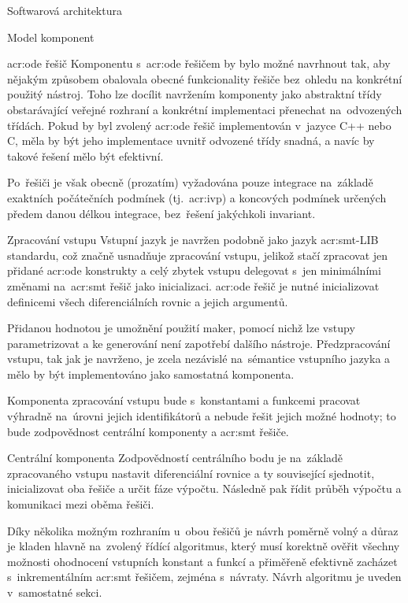 \documentclass[thesis=M,czech]{FITthesis}[2012/06/26]
\newcommand{\acrlabel}[1]{acr:#1}
\newcommand{\acr}[1]{\acrshort{\acrlabel{#1}}}
\begin{document}
\begin{section}{Softwarová architektura}
\begin{subsection}{Model komponent}
\begin{subsubsection}{\acr{ode} řešič}
Komponentu s~\acr{ode} řešičem
by bylo možné navrhnout tak,
aby nějakým způsobem obalovala
obecné funkcionality řešiče
bez~ohledu na konkrétní použitý nástroj.
Toho lze docílit navržením komponenty
jako abstraktní třídy
obstarávající veřejné rozhraní
a konkrétní implementaci přenechat
na~odvozených třídách.
Pokud by byl zvolený \acr{ode} řešič
implementován v~jazyce C++ nebo C,
měla by být jeho implementace
uvnitř odvozené třídy snadná,
a navíc by takové řešení mělo být efektivní.

Po~řešiči je však obecně (prozatím) vyžadována
pouze integrace na~základě
exaktních počátečních podmínek (tj.~\acr{ivp})
a koncových podmínek
určených předem danou délkou integrace,
bez~řešení jakýchkoli invariant.
\end{subsubsection} %


\begin{subsubsection}{Zpracování vstupu}\label{sss:design:arch:comp:parse}
Vstupní jazyk je navržen podobně
jako jazyk \acr{smt}-LIB standardu,
což značně usnadňuje zpracování vstupu,
jelikož stačí zpracovat jen přidané \acr{ode} konstrukty
a celý zbytek vstupu delegovat s~jen minimálními změnami
na~\acr{smt} řešič jako inicializaci.
\acr{ode} řešič je nutné inicializovat
definicemi všech diferenciálních rovnic
a jejich argumentů.

Přidanou hodnotou je umožnění použití maker,
pomocí nichž lze vstupy parametrizovat
a ke generování není zapotřebí dalšího nástroje.
Předzpracování vstupu, tak jak je navrženo,
je zcela nezávislé
na~sémantice vstupního jazyka
a mělo by být implementováno jako samostatná komponenta.

Komponenta zpracování vstupu bude s~konstantami a funkcemi
pracovat výhradně na~úrovni jejich identifikátorů
a nebude řešit jejich možné hodnoty;
to bude zodpovědnost centrální komponenty
a \acr{smt} řešiče.
\end{subsubsection} %


\begin{subsubsection}{Centrální komponenta}
\label{sss:design:arch:comp:center}
Zodpovědností centrálního bodu je
na~základě zpracovaného vstupu
nastavit diferenciální rovnice
a ty související sjednotit,
inicializovat oba řešiče
a určit fáze výpočtu.
Následně pak řídit
průběh výpočtu
a komunikaci mezi oběma řešiči.

Díky několika možným rozhraním u~obou řešičů
je návrh poměrně volný
a důraz je kladen hlavně na~zvolený řídící algoritmus,
který musí korektně ověřit všechny možnosti
ohodnocení vstupních konstant a funkcí
a přiměřeně efektivně zacházet
s~inkrementálním \acr{smt} řešičem, zejména s~návraty.
Návrh algoritmu je uveden v~samostatné sekci.
\end{subsubsection} %


\end{subsection}
\end{section}
\end{document}
